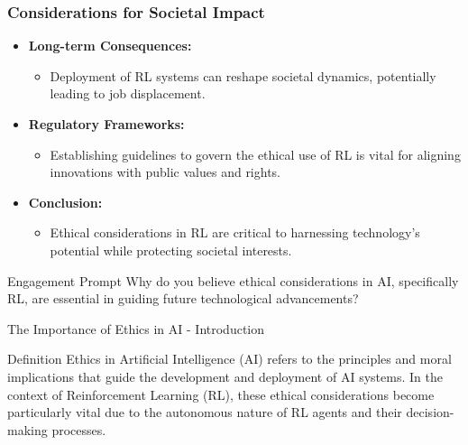 \documentclass[aspectratio=169]{beamer}
\begin{document}
\begin{frame}[fragile]
    \frametitle{Considerations for Societal Impact}
    \begin{itemize}
        \item \textbf{Long-term Consequences:} 
            \begin{itemize}
                \item Deployment of RL systems can reshape societal dynamics, potentially leading to job displacement.
            \end{itemize}
        \item \textbf{Regulatory Frameworks:} 
            \begin{itemize}
                \item Establishing guidelines to govern the ethical use of RL is vital for aligning innovations with public values and rights.
            \end{itemize}
        \item \textbf{Conclusion:} 
            \begin{itemize}
                \item Ethical considerations in RL are critical to harnessing technology's potential while protecting societal interests. 
            \end{itemize}
    \end{itemize}
    \begin{block}{Engagement Prompt}
        Why do you believe ethical considerations in AI, specifically RL, are essential in guiding future technological advancements?
    \end{block}
\end{frame}

\begin{frame}[fragile]{The Importance of Ethics in AI - Introduction}
    \begin{block}{Definition}
        Ethics in Artificial Intelligence (AI) refers to the principles and moral implications that guide the development and deployment of AI systems. In the context of Reinforcement Learning (RL), these ethical considerations become particularly vital due to the autonomous nature of RL agents and their decision-making processes.
    \end{block}
\end{frame}
\end{document}
